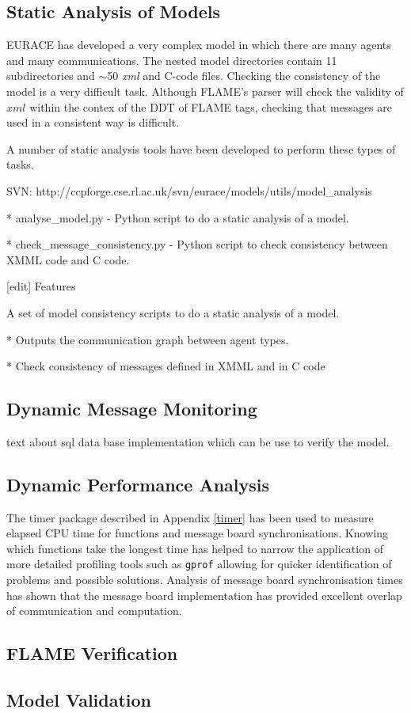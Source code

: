 \subsection{Static Analysis of Models}


EURACE has developed a very complex model in which there are many agents and many communications. The nested model directories contain 11 subdirectories and $\sim$50 \textit{xml} and C-code files. Checking the consistency of the model is a very difficult task. Although FLAME's parser will check the validity of $xml$ within the contex of the DDT of FLAME tags, checking that messages are used in a consistent way is difficult.


A number of static analysis tools have been developed to perform these types of tasks.


SVN: http://ccpforge.cse.rl.ac.uk/svn/eurace/models/utils/model_analysis


    * analyse_model.py - Python script to do a static analysis of a model.

    * check_message_consistency.py - Python script to check consistency between XMML code and C code. 


[edit] Features


A set of model consistency scripts to do a static analysis of a model.


    * Outputs the communication graph between agent types.

    * Check consistency of messages defined in XMML and in C code 


\subsection{Dynamic Message Monitoring}


text about sql data base implementation which can be use to verify the model.


\subsection{Dynamic Performance Analysis}


The timer package described in Appendix \ref{timer} has been used to measure elapsed CPU time for functions and message board synchronisations. Knowing which functions take the longest time has helped to narrow the application of more detailed profiling tools such as \texttt{gprof} allowing for quicker identification of problems and possible solutions. Analysis of message board synchronisation times has shown that the message board implementation has provided excellent overlap of communication and computation.


\subsection {FLAME Verification}


\subsection{Model Validation}